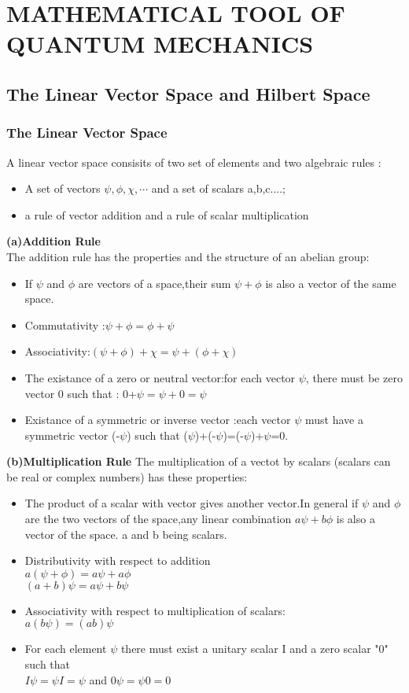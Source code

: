 \chapter{MATHEMATICAL TOOL OF QUANTUM MECHANICS}
\section{The Linear Vector Space and Hilbert Space}
\subsection{The Linear Vector Space}
A linear vector space consisits of two set of elements and two algebraic rules :
\begin{itemize}
	\item A set of vectors $\psi,\phi,\chi, \cdots $ and a set of scalars a,b,c....;
	\item a rule of vector addition and a rule of scalar multiplication
\end{itemize}
\textbf{(a)Addition Rule}\\
The addition rule has the properties and the structure of an abelian group:
\begin{itemize}
	\item If $\psi$ and $\phi$ are vectors of a space,their sum $\psi+\phi$ is also a vector of the same space.
	\item Commutativity :$\psi+\phi=\phi+\psi$
	\item Associativity:$(\psi+\phi)+\chi=\psi+(\phi+\chi)$
	\item The existance of a zero or neutral vector:for each vector $\psi$, there must be zero vector 0 such that : 0+$\psi=\psi+0=\psi$
	\item Existance of a symmetric or inverse vector :each vector $\psi$ must have a symmetric vector (-$\psi$) such that ($\psi$)+(-$\psi$)=(-$\psi$)+$\psi$=0.
\end{itemize}
\textbf{(b)Multiplication Rule}
The multiplication of a vectot by scalars (scalars can be real or complex numbers) has these properties:
\begin{itemize}
	\item The product of a scalar with vector gives another vector.In general if $\psi$ and $\phi$ are the two vectors of the space,any linear combination $a\psi+b\phi$ is also a vector of the space. a and b being scalars.
	\item Distributivity with respect to addition\\
	$a(\psi+\phi)=a\psi+a\phi$\\
	$(a+b)\psi=a\psi+b\psi$
	\item Associativity with respect to multiplication of scalars:\\
	$a(b\psi)=(ab)\psi$
	\item For each element $\psi$ there must exist a unitary scalar I and a zero scalar "0" such that \\
	$I\psi=\psi I =\psi$ and $0\psi=\psi0=0$
\end{itemize}
